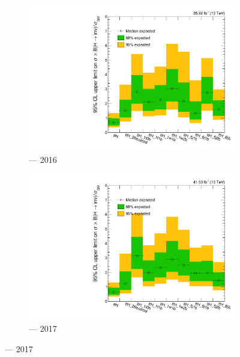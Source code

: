 \begin{figure}[htbp]
    \centering
    \begin{subfigure}[b]{0.45\textwidth}
        \includegraphics[width=\textwidth]{figures/limits/ttH/limit_2016_ttH_Scenario5.pdf}
        \caption{\ttH --- 2016}
    \end{subfigure}
    \hfill
    \begin{subfigure}[b]{0.45\textwidth}
        \includegraphics[width=\textwidth]{figures/limits/ttH/limit_2017_ttH_Scenario5.pdf}
        \caption{\ttH --- 2017}
    \end{subfigure}


\end{figure}
